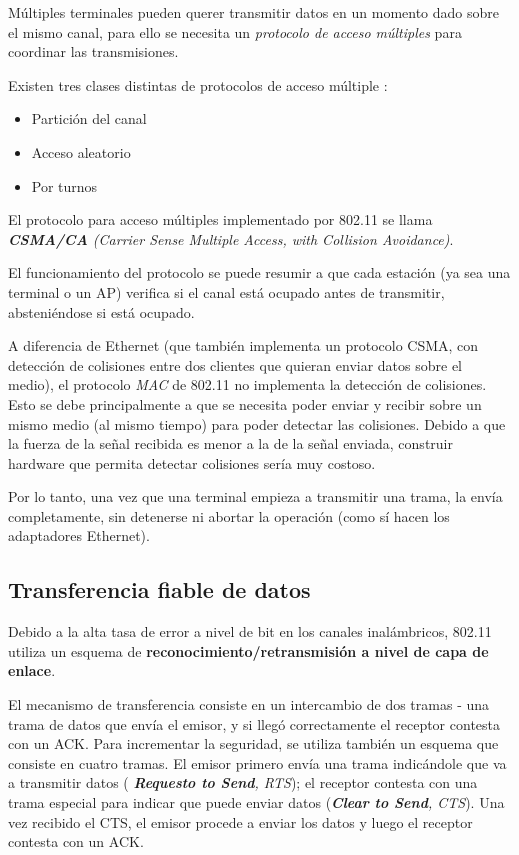 Múltiples terminales pueden querer transmitir datos en un momento dado sobre el mismo canal, para ello se necesita un \emph{protocolo de acceso múltiples} para coordinar las transmisiones.

Existen tres clases distintas de protocolos de acceso múltiple \autocite{Kurose:Wireless}:

\begin{itemize}
    \item Partición del canal
    \item Acceso aleatorio
    \item Por turnos
\end{itemize}

El protocolo para acceso múltiples implementado por 802.11 se llama \emph{\textbf{CSMA/CA} (Carrier Sense Multiple Access, with Collision Avoidance)}. 

El funcionamiento del protocolo se puede resumir a que cada estación (ya sea una terminal o un AP) verifica si el canal está ocupado antes de transmitir, absteniéndose si está ocupado.

A diferencia de Ethernet (que también implementa un protocolo CSMA, con detección de colisiones entre dos clientes que quieran enviar datos sobre el medio), el protocolo \emph{MAC} de 802.11 no implementa la detección de colisiones. Esto se debe principalmente a que se necesita poder enviar y recibir sobre un mismo medio (al mismo tiempo) para poder detectar las colisiones. Debido a que la fuerza de la señal recibida es menor a la de la señal enviada, construir hardware que permita detectar colisiones sería muy costoso.

Por lo tanto, una vez que una terminal empieza a transmitir una trama, la envía completamente, sin detenerse ni abortar la operación (como sí hacen los adaptadores Ethernet).

\subsection{Transferencia fiable de datos}

Debido a la alta tasa de error a nivel de bit en los canales inalámbricos, 802.11 utiliza un esquema de \textbf{reconocimiento/retransmisión a nivel de capa de enlace}.

El mecanismo de transferencia consiste en un intercambio de dos tramas - una trama de datos que envía el emisor, y si llegó correctamente el receptor contesta con un ACK. Para incrementar la seguridad, se utiliza también un esquema que consiste en cuatro tramas. El emisor primero envía una trama indicándole que va a transmitir datos (\emph{ \textbf{Requesto to Send}, RTS}); el receptor contesta con una trama especial para indicar que puede enviar datos (\emph{\textbf{Clear to Send}, CTS}). Una vez recibido el CTS, el emisor procede a enviar los datos y luego el receptor contesta con un ACK.

